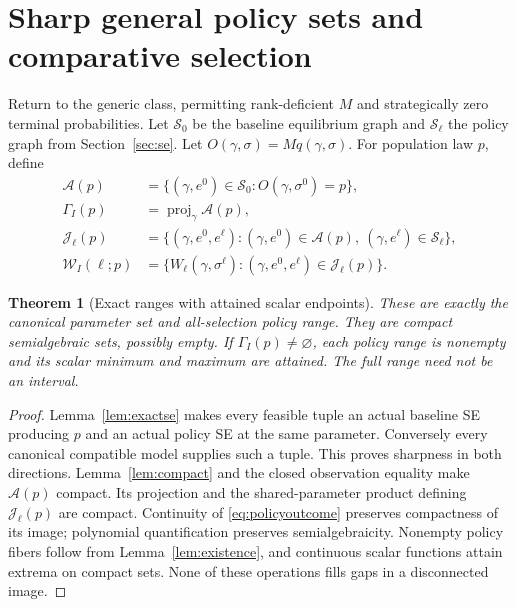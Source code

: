 \documentclass[11pt,a4paper]{article}
\numberwithin{equation}{section}
\newtheorem{theorem}{Theorem}
\theoremstyle{definition}
\begin{document}
\section{Sharp general policy sets and comparative selection}
\label{sec:policysets}
Return to the generic class, permitting rank-deficient \(M\) and
strategically zero terminal probabilities. Let \(\mathcal S_0\)
be the baseline equilibrium graph and \(\mathcal S_\ell\) the
policy graph from Section~\ref{sec:se}. Let
\(O(\gamma,\sigma)=Mq(\gamma,\sigma)\). For population law \(p\), define
\begin{equation}\label{eq:policysets}
 \begin{aligned}
 \mathcal A(p)&=\{(\gamma,e^0)\in\mathcal S_0:
                         O(\gamma,\sigma^0)=p\},\\
 \Gamma_I(p)&=\operatorname{proj}_\gamma\mathcal A(p),\\
 \mathcal J_\ell(p)&=\{(\gamma,e^0,e^\ell):
        (\gamma,e^0)\in\mathcal A(p),\
        (\gamma,e^\ell)\in\mathcal S_\ell\},\\
 \mathcal W_I(\ell;p)&=
   \{W_\ell(\gamma,\sigma^\ell):
                       (\gamma,e^0,e^\ell)\in\mathcal J_\ell(p)\}.
 \end{aligned}
\end{equation}

\begin{theorem}[Exact ranges with attained scalar endpoints]
\label{thm:generalsets}
These are exactly the canonical parameter set and all-selection
policy range. They are compact semialgebraic sets, possibly empty.
If \(\Gamma_I(p)\ne\varnothing\), each policy range is nonempty and
its scalar minimum and maximum are attained.
The full range need not be an interval.
\end{theorem}
\begin{proof}
Lemma~\ref{lem:exactse} makes every feasible tuple an actual baseline
SE producing \(p\) and an actual policy SE at the same parameter.
Conversely every canonical compatible model supplies such a tuple.
This proves sharpness in both directions.
Lemma~\ref{lem:compact} and the closed observation equality make
\(\mathcal A(p)\) compact. Its projection and the shared-parameter
product defining \(\mathcal J_\ell(p)\) are compact.
Continuity of \eqref{eq:policyoutcome} preserves compactness of
its image; polynomial quantification preserves semialgebraicity.
Nonempty policy fibers follow from Lemma~\ref{lem:existence},
and continuous scalar functions attain extrema on compact sets.
None of these operations fills gaps in a disconnected image.
\end{proof}
\end{document}
